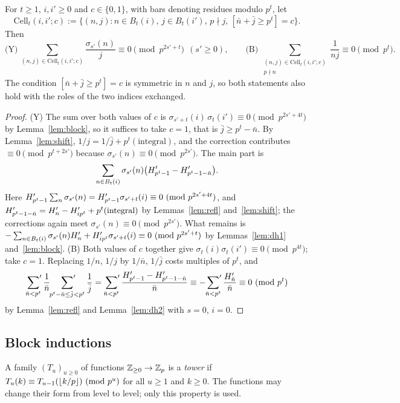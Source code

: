 \documentclass[11pt]{amsart}
\begin{document}
\begin{lemma}\label{lem:carry}
For $t\ge1$, $i,i'\ge0$ and $c\in\{0,1\}$, with bars denoting residues modulo $p^t$, let
\[ \mathrm{Cell}_t(i,i';c):=\bigl\{(n,j):n\in B_t(i),\,j\in B_t(i'),\,p\nmid j,\,[\bar n+\bar j\ge p^t]=c\bigr\}. \]
Then
\[ \text{(Y)}\ \sum_{(n,j)\in\mathrm{Cell}_t(i,i';c)}\frac{\sigma_{s'}(n)}j\equiv0\pmod{p^{2s'+t}}\ \ (s'\ge0),\qquad\text{(B)}\ \sum_{\substack{(n,j)\in\mathrm{Cell}_t(i,i';c)\\ p\nmid n}}\frac1{nj}\equiv0\pmod{p^t}. \] The condition $[\bar n+\bar j\ge p^t]=c$ is symmetric in $n$ and $j$, so both statements also hold with the roles of the two indices exchanged.
\end{lemma}
\begin{proof}
(Y) The sum over both values of $c$ is $\sigma_{s'+t}(i)\,\sigma_t(i')\equiv0\pmod{p^{2s'+4t}}$ by Lemma~\ref{lem:block}, so it suffices to take $c=1$, that is $\bar j\ge p^t-\bar n$. By Lemma~\ref{lem:shift}, $1/j=1/\bar j+p^t(\text{integral})$, and the correction contributes $\equiv0\pmod{p^{t+2s'}}$ because $\sigma_{s'}(n)\equiv0\pmod{p^{2s'}}$. The main part is
\[ \sum_{n\in B_t(i)}\sigma_{s'}(n)\bigl(H'_{p^t-1}-H'_{p^t-1-\bar n}\bigr). \]
Here $H'_{p^t-1}\sum_n\sigma_{s'}(n)=H'_{p^t-1}\sigma_{s'+t}(i)\equiv0\ (\mathrm{mod}\ p^{2s'+4t})$, and $H'_{p^t-1-\bar n}=H'_n-H'_{ip^t}+p^t(\text{integral})$ by Lemmas~\ref{lem:refl} and~\ref{lem:shift}; the corrections again meet $\sigma_{s'}(n)\equiv0\pmod{p^{2s'}}$. What remains is $-\sum_{n\in B_t(i)}\sigma_{s'}(n)H'_n+H'_{ip^t}\sigma_{s'+t}(i)\equiv0\ (\mathrm{mod}\ p^{2s'+t})$ by Lemmas~\ref{lem:dh1} and~\ref{lem:block}.
(B) Both values of $c$ together give $\sigma_t(i)\sigma_t(i')\equiv0\pmod{p^{4t}}$; take $c=1$. Replacing $1/n$, $1/j$ by $1/\bar n$, $1/\bar j$ costs multiples of $p^t$, and
\[ \sideset{}{'}\sum_{\bar n<p^t}\frac1{\bar n}\sideset{}{'}\sum_{p^t-\bar n\le\bar j<p^t}\frac1{\bar j}=\sideset{}{'}\sum_{\bar n<p^t}\frac{H'_{p^t-1}-H'_{p^t-1-\bar n}}{\bar n}\equiv-\sideset{}{'}\sum_{\bar n<p^t}\frac{H'_{\bar n}}{\bar n}\equiv0\ (\mathrm{mod}\ p^t) \]
by Lemma~\ref{lem:refl} and Lemma~\ref{lem:dh2} with $s=0$, $i=0$.
\end{proof}

\subsection{Block inductions}
A family $(T_u)_{u\ge0}$ of functions $\mathbb{Z}_{\ge0}\to\mathbb{Z}_{p}$ is a \emph{tower} if $T_u(k)\equiv T_{u-1}(\left\lfloor k/p\right\rfloor)\ (\mathrm{mod}\ p^u)$ for all $u\ge1$ and $k\ge0$. The functions may change their form from level to level; only this property is used.
\end{document}
